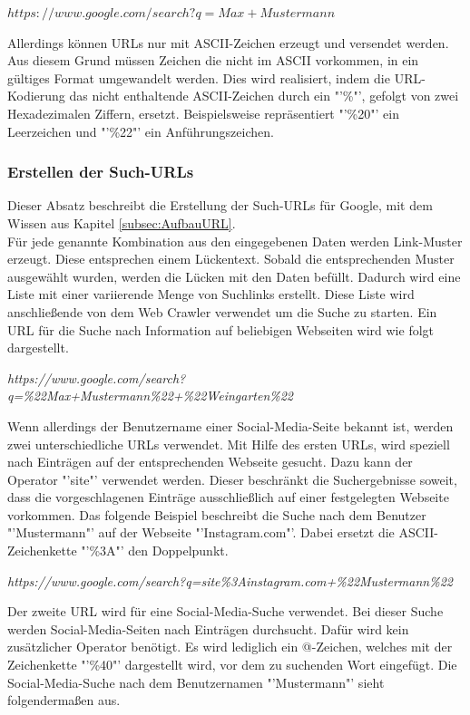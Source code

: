 			$https://www.google.com/search?q=Max+Mustermann$
			
			Allerdings können URLs nur mit ASCII-Zeichen erzeugt und versendet werden. Aus diesem Grund müssen Zeichen die nicht im ASCII vorkommen, in ein gültiges Format umgewandelt werden. Dies wird realisiert, indem die URL-Kodierung das nicht enthaltende ASCII-Zeichen durch ein "'\%"', gefolgt von zwei Hexadezimalen Ziffern, ersetzt. Beispielsweise repräsentiert "'\%20"' ein Leerzeichen und "'\%22"' ein Anführungszeichen. \cite{HTMLURL} \\
			
			\subsubsection{Erstellen der Such-URLs}
			Dieser Absatz beschreibt die Erstellung der Such-URLs für Google, mit dem Wissen aus Kapitel \ref{subsec:AufbauURL}.\\
			Für jede genannte Kombination aus den eingegebenen Daten werden Link-Muster erzeugt. Diese entsprechen einem Lückentext. Sobald die entsprechenden Muster ausgewählt wurden, werden die Lücken mit den Daten befüllt. Dadurch wird eine Liste mit einer variierende Menge von Suchlinks erstellt. Diese Liste wird anschließende von dem Web Crawler verwendet um die Suche zu starten.
			Ein URL für die Suche nach Information auf beliebigen Webseiten wird wie folgt dargestellt.
			
			\textit{https://www.google.com/search?q=\%22Max+Mustermann\%22+\%22Weingarten\%22}
			
			Wenn allerdings der Benutzername einer Social-Media-Seite bekannt ist, werden zwei unterschiedliche URLs verwendet. Mit Hilfe des ersten URLs, wird speziell nach Einträgen auf der entsprechenden Webseite gesucht. Dazu kann der Operator "'site"' verwendet werden. Dieser beschränkt die Suchergebnisse soweit, dass die vorgeschlagenen Einträge ausschließlich auf einer festgelegten Webseite vorkommen. Das folgende Beispiel beschreibt die Suche nach dem Benutzer "'Mustermann"' auf der Webseite "'Instagram.com"'. Dabei ersetzt die ASCII-Zeichenkette "'\%3A"' den Doppelpunkt. \cite{HTMLURL}
			
			\textit{https://www.google.com/search?q=site\%3Ainstagram.com+\%22Mustermann\%22}
			
			Der zweite URL wird für eine Social-Media-Suche verwendet. Bei dieser Suche werden Social-Media-Seiten nach Einträgen durchsucht. Dafür wird kein zusätzlicher Operator benötigt. Es wird lediglich ein @-Zeichen, welches mit der Zeichenkette "'\%40"' dargestellt wird, vor dem zu suchenden Wort eingefügt. Die Social-Media-Suche nach dem Benutzernamen "'Mustermann"' sieht folgendermaßen aus.\cite{SocialMediaSearch}
			
